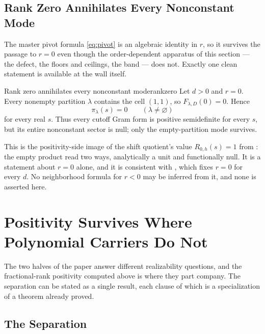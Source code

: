 \documentclass[11pt,letterpaper]{article}
\newcommand{\Rm}{R}                          %
\begin{document}
\subsection{Rank Zero Annihilates Every Nonconstant Mode}
The master pivot formula \eqref{eq:pivot} is an algebraic identity in $r$, so it
survives the passage to $r=0$ even though the order-dependent apparatus of this
section --- the defect, the floors and ceilings, the band --- does not. Exactly one
clean statement is available at the wall itself.

\begin{proposition}{Rank zero annihilates every nonconstant mode}{rankzero}
Let $d>0$ and $r=0$. Every nonempty partition $\lambda$ contains the cell
$(1,1)$, so $F_{\lambda,D}(0)=0$. Hence
\begin{equation}
  \pi_\lambda(s)=0\qquad(\lambda\ne\varnothing)
  \label{eq:vacuum}
\end{equation}
for every real $s$. Thus every cutoff Gram form is positive semidefinite for
every $s$, but its entire nonconstant sector is null; only the empty-partition
mode survives.
\end{proposition}

This is the positivity-side image of the shift quotient's value $\Rm_{0,h}(s)=1$ from
: the empty product read two ways, analytically a unit and
functionally null. It is a statement about $r=0$ alone, and it is consistent with
, which fixes $r=0$ for every $d$. No neighborhood formula
for $r<0$ may be inferred from it, and none is asserted here.

\section{Positivity Survives Where Polynomial Carriers Do Not}
\label{sec:scope}

The two halves of the paper answer different realizability questions, and the
fractional-rank positivity computed above is where they part company. The
separation can be stated as a single result, each clause of which is a
specialization of a theorem already proved.

\subsection{The Separation}
\end{document}
